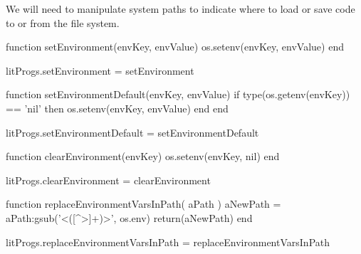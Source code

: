 
\startchapter[title=Manipulating of system paths]

We will need to manipulate system paths to indicate where to load or save 
code to or from the file system.

\startMkIVCode
\def\setEnvironment#1#2{
  \directlua{
    thirddata.literateProgs.setEnvironment('#1', '#2')
  }
}

\def\setEnvironmentDefault#1#2{
  \directlua{
    thirddata.literateProgs.setEnvironmentDefault('#1', '#2')
  }
}

\def\clearEnvironemtn#1{
  \directlua{
    thirddata.literateProgs.clearEnvironment('#1')
  }
}
\stopMkIVCode


\startLuaCode
function setEnvironment(envKey, envValue)
  os.setenv(envKey, envValue)
end

litProgs.setEnvironment = setEnvironment

function setEnvironmentDefault(envKey, envValue)
  if type(os.getenv(envKey)) == 'nil' then
    os.setenv(envKey, envValue)
  end
end

litProgs.setEnvironmentDefault = setEnvironmentDefault

function clearEnvironment(envKey)
  os.setenv(envKey, nil)
end

litProgs.clearEnvironment = clearEnvironment
\stopLuaCode


\startLuaCode
function replaceEnvironmentVarsInPath( aPath )
  aNewPath = aPath:gsub('<([^>]+)>', os.env)
  return(aNewPath)
end

litProgs.replaceEnvironmentVarsInPath = replaceEnvironmentVarsInPath

\stopLuaCode
